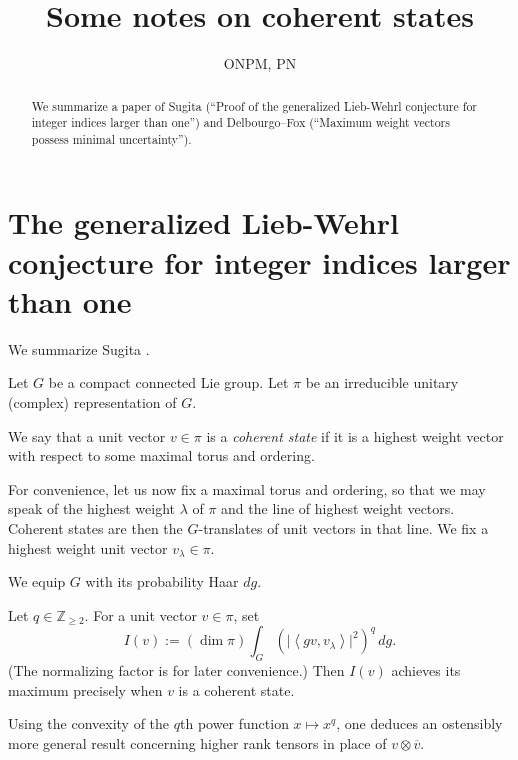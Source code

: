 \documentclass[reqno]{amsart} 
\begin{document}
\author{ONPM, PN}
\title{Some notes on coherent states}


\begin{abstract}
  We summarize a paper of Sugita (``Proof of the generalized Lieb-Wehrl conjecture for integer indices larger than one'') and Delbourgo--Fox (``Maximum weight vectors possess minimal uncertainty'').
\end{abstract}

\maketitle

\section{The generalized Lieb-Wehrl conjecture for integer indices larger than one}\label{sec:cngub4lfbx}
We summarize Sugita \cite{MR1946863}.

Let $G$ be a compact connected Lie group.  Let $\pi$ be an irreducible unitary (complex) representation of $G$.

\begin{definition}\label{definition:cngsx0l9k6}
  We say that a unit vector $v \in \pi$ is a \emph{coherent state} if it is a highest weight vector with respect to some maximal torus and ordering.
\end{definition}

For convenience, let us now fix a maximal torus and ordering, so that we may speak of the highest weight $\lambda$ of $\pi$ and the line of highest weight vectors.  Coherent states are then the $G$-translates of unit vectors in that line.  We fix a highest weight unit vector $v_\lambda \in \pi$.

We equip $G$ with its probability Haar $d g$.

\begin{theorem}\label{theorem:cngsx0yg7y}
  Let $q \in \mathbb{Z}_{\geq 2}$.  For a unit vector $v \in \pi$, set
  \begin{equation*}
    I(v) :=
    (\dim \pi)
    \int_{G}
    \left( \lvert \left\langle g v, v_\lambda \right\rangle \rvert^2 \right)^q
    \, d g.
  \end{equation*}
  (The normalizing factor is for later convenience.)  Then $I(v)$ achieves its maximum precisely when $v$ is a coherent state.
\end{theorem}
\begin{remark}\label{remark:cngsx0yf26}
  Using the convexity of the $q$th power function $x \mapsto x^q$, one deduces an ostensibly more general result concerning higher rank tensors in place of $v \otimes \overline{v}$.
\end{remark}
\end{document}
